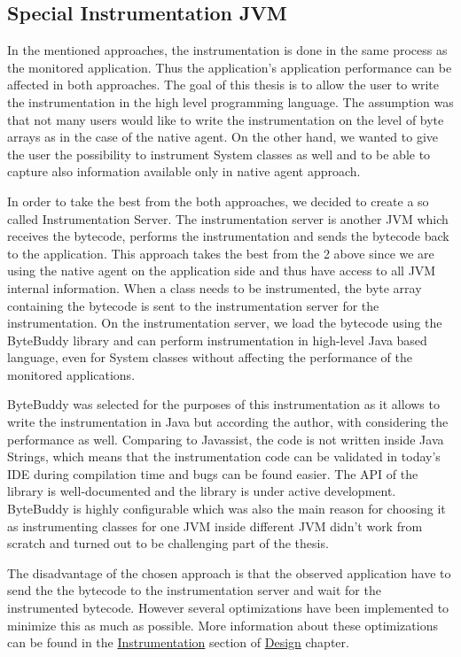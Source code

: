 \subsection{Special Instrumentation JVM}
\label{subsec:inst_jvm}
In the mentioned approaches, the instrumentation is done in the same process as the monitored application. Thus the application's application performance can be affected in both approaches. The goal of this thesis is to allow the user to write the instrumentation in the high level programming language. The assumption was that not many users would like to write the instrumentation on the level of byte arrays as in the case of the native agent. On the other hand, we wanted to give the user the possibility to instrument System classes as well and to be able to capture also information available only in native agent approach.

In order to take the best from the both approaches, we decided to create a so called Instrumentation Server. The instrumentation server is another JVM which receives the bytecode, performs the instrumentation and sends the bytecode back to the application.
This approach takes the best from the 2 above since we are using the native agent on the application side and thus have access to all JVM internal information. When a class needs to be instrumented,  the byte array containing the bytecode is sent to the instrumentation server for the instrumentation. On the instrumentation server, we load the bytecode using the ByteBuddy library and can perform instrumentation in high-level Java based language, even for System classes without affecting the performance of the monitored applications.

ByteBuddy was selected for the purposes of this instrumentation as it allows to write the instrumentation in Java but according the author, with considering the performance as well. Comparing to Javassist, the code is not written inside Java Strings, which means that the instrumentation code can be validated in today's IDE during compilation time and bugs can be found easier. The API of the library is well-documented and the library is under active development. ByteBuddy is highly configurable which was also the main reason for choosing it as instrumenting classes for one JVM inside different JVM didn't work from scratch and turned out to be challenging part of the thesis.

The disadvantage of the chosen approach is that the observed application have to send the the bytecode to the instrumentation server and wait for the instrumented bytecode. However several optimizations have been implemented to minimize this as much as possible. More information about these optimizations can be found in the \hyperref[sec:inst_server]{Instrumentation} section of \hyperref[chap:design]{Design} chapter.

